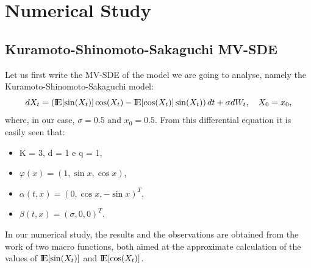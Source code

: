\documentclass[a4paper,11pt,openright]{report}
\begin{document}
\chapter*{Numerical Study}

\section{Kuramoto-Shinomoto-Sakaguchi MV-SDE}
Let us first write the MV-SDE of the model we are going to analyse, namely the Kuramoto-Shinomoto-Sakaguchi model:
\[
dX_t = \left( {\rm I\!E}[\sin(X_t)] \cos(X_t) - {\rm I\!E}[\cos(X_t)]\sin(X_t) \right) dt + \sigma dW_t , \ \ \ X_0=x_0, 
\]
where, in our case, $\sigma = 0.5$ and $x_0 = 0.5$. From this differential equation it is easily seen that:
\begin{itemize}
\item K = 3, d = 1 e q = 1,
\item $\varphi(x)=(1, \sin x, \cos x)$, 
\item $\alpha(t,x)=(0, \cos x, -\sin x)^T$, 
\item $\beta(t,x)=(\sigma, 0, 0)^T$.
\end{itemize}
In our numerical study, the results and the observations are obtained from the work of two macro functions, both aimed at the approximate calculation of the values of ${\rm I\!E}[\sin(X_t)]$ and ${\rm I\!E}[\cos(X_t)]$.
\end{document}
